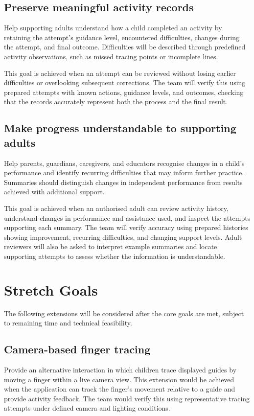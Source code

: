 \documentclass{article}
\begin{document}
\subsection{Preserve meaningful activity records}

Help supporting adults understand how a child completed an activity
by retaining the attempt's guidance level, encountered difficulties,
changes during the attempt, and final outcome. Difficulties will be
described through predefined activity observations, such as missed
tracing points or incomplete lines.

This goal is achieved when an attempt can be reviewed without losing
earlier difficulties or overlooking subsequent corrections. The team
will verify this using prepared attempts with known actions, guidance
levels, and outcomes, checking that the records accurately represent
both the process and the final result.

\subsection{Make progress understandable to supporting adults}

Help parents, guardians, caregivers, and educators recognise changes
in a child's performance and identify recurring difficulties that may
inform further practice. Summaries should distinguish changes in
independent performance from results achieved with additional support.

This goal is achieved when an authorised adult can review activity
history, understand changes in performance and assistance used, and
inspect the attempts supporting each summary. The team will verify
accuracy using prepared histories showing improvement, recurring
difficulties, and changing support levels. Adult reviewers will also
be asked to interpret example summaries and locate supporting attempts
to assess whether the information is understandable.

\section{Stretch Goals}
\renewcommand{\thesubsection}{SG.\arabic{subsection}}

The following extensions will be considered after the core goals are
met, subject to remaining time and technical feasibility.

\subsection{Camera-based finger tracing}
Provide an alternative interaction in which children trace displayed
guides by moving a finger within a live camera view. This extension
would be achieved when the application can track the finger's movement
relative to a guide and provide activity feedback. The team would
verify this using representative tracing attempts under defined camera
and lighting conditions.
\end{document}

